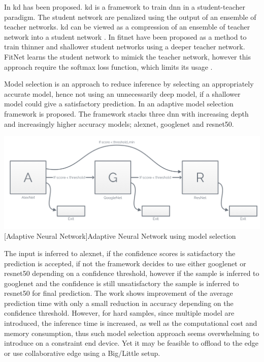 \begin{enumdescript}
	In \cite{hinton_distilling_2015} \gls{kd} has been proposed. \gls{kd} is a framework to train \gls{dnn} in a student-teacher paradigm. The student network are penalized using the output of an ensemble of teacher networks. \gls{kd} can be viewed as a compression of an ensemble of teacher network into a student network \cite{cheng_survey_2017}. 
	In \cite{romero_fitnets:_2014} \gls{fitnet} have been proposed as a method to train thinner and shallower student networks using a deeper teacher network. FitNet learns the student network to mimick the teacher network, however this approach require the softmax loss function, which limits its usage \cite{cheng_survey_2017}.  
	
	\item[Model Selection] Model selection is an approach to reduce inference by selecting an appropriately accurate model, hence not using an unnecessarily deep model, if a shallower model could give a satisfactory prediction. In \cite{bolukbasi_adaptive_2017} an adaptive model selection framework is proposed. The framework stacks three \gls{dnn} with increasing depth and increasingly higher accuracy models; \gls{alexnet}, \gls{googlenet} and \gls{resnet}50. 

	\begin{minipage}[t]{\linewidth}                              
		\includegraphics[width=\linewidth]{figures/models/adaptive}
		[Adaptive Neural Network]{Adaptive Neural Network using model selection}
	\end{minipage}
	
	The input is inferred to \gls{alexnet}, if the confidence scores is satisfactory the prediction is accepted, if not the framework decides to use either \gls{googlenet} or \gls{resnet}50 depending on a confidence threshold, however if the sample is inferred to \gls{googlenet} and the confidence is still unsatisfactory the sample is inferred to \gls{resnet}50 for final prediction. The work shows improvement of the average prediction time with only a small reduction in accuracy depending on the confidence threshold. However, for hard samples, since multiple model are introduced, the inference time is increased, as well as the computational cost and memory consumption, thus such model selection approach seems overwhelming to introduce on a constraint end device. Yet it may be feasible to offload to the edge or use collaborative edge using a Big/Little setup.
	

\end{enumdescript}
